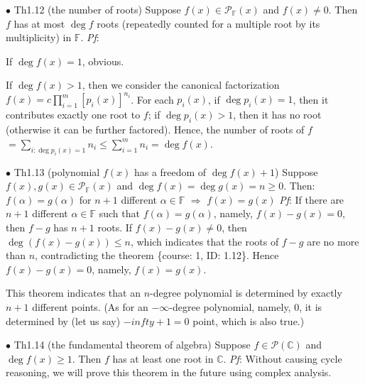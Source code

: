 \documentclass{article}
\begin{document}
\begin{Th}{$\bullet$ Th1.12 (the number of roots)}
    Suppose $f(x)\in\mathcal{P}_\mathbb{F}(x)$ and $f(x)\neq 0$. Then $f$ has at most $\deg f$ roots (repeatedly counted for a multiple root by its multiplicity) in $\mathbb{F}$.
    \tcblower
    \textit{Pf}: \begin{compactenum}
        \item If $\deg f(x) = 1 $, obvious.
        \item If $\deg f(x)>1$, then we consider the canonical factorization $f(x) = c\prod_{i=1}^{m}[p_i(x)]^{n_i}$. For each $p_i(x)$, if $\deg p_i(x) = 1$, then it contributes exactly one root to $f$; if $\deg p_i(x)>1$, then it has no root (otherwise it can be further factored). Hence, the number of roots of $f$ $=\sum_{i:\deg p_i(x) = 1} n_i \leq \sum_{i=1}^{m} n_i = \deg f(x)$.
    \end{compactenum} 
\end{Th}

\begin{Th}{$\bullet$ Th1.13 (polynomial $f(x)$ has a freedom of $\deg f(x)+1$)}
    Suppose $f(x), g(x)\in\mathcal{P}_\mathbb{F}(x)$ and $\deg f(x)=\deg g(x)= n\geq 0$. Then:\\
    $f(\alpha) = g(\alpha)$ for $n+1$ different $\alpha\in\mathbb{F}$ $\Rightarrow$ $f(x) = g(x)$
    \tcblower
    \textit{Pf}: If there are $n+1$ different $\alpha\in\mathbb{F}$ such that $f(\alpha) = g(\alpha)$, namely, $f(x)-g(x) = 0$, then $f-g$ has $n+1$ roots. If $f(x)-g(x)\neq 0$, then $\deg(f(x)-g(x))\leq n$, which indicates that the roots of $f-g$ are no more than $n$, contradicting the theorem \{course: 1, ID: 1.12\}. Hence $f(x)-g(x) = 0$, namely, $f(x) = g(x)$.
\end{Th}

\begin{Rmk}{}
    This theorem indicates that an $n$-degree polynomial is determined by exactly $n+1$ different points. (As for an $-\infty$-degree polynomial, namely, $0$, it is determined by (let us say) $-infty+1=0$ point, which is also true.) 
\end{Rmk}

\begin{Th}{$\bullet$ Th1.14 (the fundamental theorem of algebra)}
    Suppose $f\in\mathcal{P}(\mathbb{C})$ and $\deg f(x)\geq 1$. Then $f$ has at least one root in $\mathbb{C}$.
    \tcblower
    \textit{Pf}: Without causing cycle reasoning, we will prove this theorem in the future using complex analysis.
\end{Th}
\end{document}
